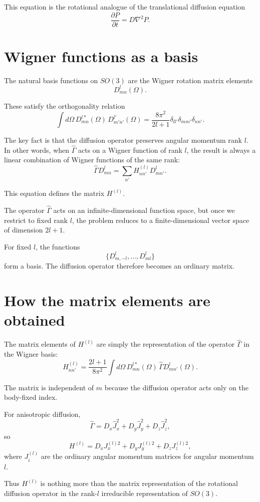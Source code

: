 \documentclass[11pt]{article}
\begin{document}
This equation is the rotational analogue of the translational diffusion
equation
\[
\frac{\partial P}{\partial t}=D\nabla^2 P.
\]

\section{Wigner functions as a basis}

The natural basis functions on \(SO(3)\) are the Wigner rotation matrix
elements
\[
D^l_{mn}(\Omega).
\]

These satisfy the orthogonality relation
\[
\int d\Omega\,
D^{l*}_{mn}(\Omega)\,
D^{l'}_{m'n'}(\Omega)
=
\frac{8\pi^2}{2l+1}
\delta_{ll'}
\delta_{mm'}
\delta_{nn'}.
\]

The key fact is that the diffusion operator preserves angular momentum rank
\(l\).  In other words, when \(\hat{\Gamma}\) acts on a Wigner function of
rank \(l\), the result is always a linear combination of Wigner functions of
the same rank:
\[
\hat{\Gamma} D^l_{mn}
=
\sum_{n'}
H^{(l)}_{nn'} D^l_{mn'}.
\]

This equation defines the matrix \(H^{(l)}\).

The operator \(\hat{\Gamma}\) acts on an infinite-dimensional function space,
but once we restrict to fixed rank \(l\), the problem reduces to a
finite-dimensional vector space of dimension \(2l+1\).

For fixed \(l\), the functions
\[
\{D^l_{m,-l},\ldots,D^l_{ml}\}
\]
form a basis.  The diffusion operator therefore becomes an ordinary matrix.

\section{How the matrix elements are obtained}

The matrix elements of \(H^{(l)}\) are simply the representation of the
operator \(\hat{\Gamma}\) in the Wigner basis:
\[
H^{(l)}_{nn'}
=
\frac{2l+1}{8\pi^2}
\int d\Omega\,
D^{l*}_{mn}(\Omega)\,
\hat{\Gamma}D^l_{mn'}(\Omega).
\]

The matrix is independent of \(m\) because the diffusion operator acts only
on the body-fixed index.

For anisotropic diffusion,
\[
\hat{\Gamma}
=
D_x\hat{J}_x^2
+
D_y\hat{J}_y^2
+
D_z\hat{J}_z^2,
\]
so
\[
H^{(l)}
=
D_x J_x^{(l)2}
+
D_y J_y^{(l)2}
+
D_z J_z^{(l)2},
\]
where \(J_i^{(l)}\) are the ordinary angular momentum matrices for angular
momentum \(l\).

Thus \(H^{(l)}\) is nothing more than the matrix representation of the
rotational diffusion operator in the rank-\(l\) irreducible representation of
\(SO(3)\).
\end{document}
